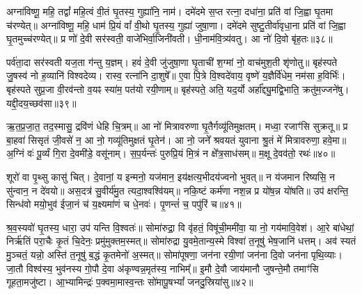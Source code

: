 अग्ना॑विष्णू॒ महि॒ तद्वां᳚ महि॒त्वं वी॒तं घृ॒तस्य॒ गुह्या॑नि॒ नाम॑। दमे॑दमे स॒प्त रत्ना॒ दधा॑ना॒ प्रति॑ वां जि॒ह्वा घृ॒तमा च॑रण्येत्॥ अग्ना॑विष्णू॒ महि॒ धाम॑ प्रि॒यं वां᳚ वी॒थो घृ॒तस्य॒ गुह्या॑ जुषा॒णा। दमे॑दमे सुष्टु॒तीर्वा॑वृधा॒ना प्रति॑ वां जि॒ह्वा घृ॒तमुच्च॑रण्येत्॥ प्र णो॑ दे॒वी सर॑स्वती॒ वाजे॑भिर्वा॒जिनी॑वती। धी॒नाम॑वि॒त्र्य॑वतु। आ नो॑ दि॒वो बृ॑ह॒तः॥३८॥

पर्व॑ता॒दा सर॑स्वती यज॒ता ग॑न्तु य॒ज्ञम्। हवं॑ दे॒वी जु॑जुषा॒णा घृ॒ताची॑ श॒ग्मां नो॒ वाच॑मुश॒ती शृ॑णोतु॥ बृह॑स्पते जु॒षस्व॑ नो ह॒व्यानि॑ विश्वदेव्य। रास्व॒ रत्ना॑नि दा॒शुषे᳚॥ ए॒वा पि॒त्रे वि॒श्वदे॑वाय॒ वृष्णे॑ य॒ज्ञैर्वि॑धेम॒ नम॑सा ह॒विर्भिः॑। बृह॑स्पते सुप्र॒जा वी॒रव॑न्तो व॒यꣴ स्या॑म॒ पत॑यो रयी॒णाम्॥ बृह॑स्पते॒ अति॒ यद॒र्यो अर्\mbox{}हा᳚द्द्यु॒मद्वि॒भाति॒ क्रतु॑म॒ज्जने॑षु। यद्दी॒दय॒च्छव॑सा॥३९॥

ऋ॒त॒प्र॒जा॒त॒ तद॒स्मासु॒ द्रवि॑णं धेहि चि॒त्रम्॥ आ नो॑ मित्रावरुणा घृ॒तैर्गव्यू॑तिमुक्षतम्। मध्वा॒ रजाꣳ॑सि सुक्रतू॥ प्र बा॒हवा॑ सिसृतं जी॒वसे॑ न॒ आ नो॒ गव्यू॑तिमुक्षतं घृ॒तेन॑। आ नो॒ जने᳚ श्रवयतं युवाना श्रु॒तं मे॑ मित्रावरुणा॒ हवे॒मा॥ अ॒ग्निं वः॑ पू॒र्व्यं गि॒रा दे॒वमी॑डे॒ वसू॑नाम्। स॒प॒र्यन्तः॑ पुरुप्रि॒यं मि॒त्रं न क्षे᳚त्र॒साध॑सम्॥ म॒क्षू दे॒वव॑तो॒ रथः॑॥४०॥

शूरो॑ वा पृ॒थ्सु कासु॑ चित्। दे॒वानां॒ य इन्मनो॒ यज॑मान॒ इय॑क्षत्य॒भीदय॑ज्वनो भुवत्॥ न य॑जमान रिष्यसि॒ न सु॑न्वान॒ न दे॑वयो॥ अस॒दत्र॑ सु॒वीर्य॑मु॒त त्यदा॒श्वश्वि॑यम्॥ नकि॒ष्टं कर्म॑णा नश॒न्न प्र यो॑ष॒न्न यो॑षति॥ उप॑ क्षरन्ति॒ सिन्ध॑वो मयो॒भुव॑ ईजा॒नं च॑ य॒क्ष्यमा॑णं च धे॒नवः॑। पृ॒णन्तं॑ च॒ पपु॑रिं च॥४१॥

श्र॒व॒स्यवो॑ घृ॒तस्य॒ धारा॒ उप॑ यन्ति वि॒श्वतः॑॥ सोमा॑रुद्रा॒ वि वृ॑हतं॒ विषू॑ची॒ममी॑वा॒ या नो॒ गय॑मावि॒वेश॑। आ॒रे बा॑धेथां॒ निर्\mbox{}ऋ॑तिं परा॒चैः कृ॒तं चि॒देनः॒ प्रमु॑मुक्तम॒स्मत्॥ सोमा॑रुद्रा यु॒वमे॒तान्य॒स्मे विश्वा॑ त॒नूषु॑ भेष॒जानि॑ धत्तम्। अव॑ स्यतं मु॒ञ्चतं॒ यन्नो॒ अस्ति॑ त॒नूषु॑ ब॒द्धं कृ॒तमेनो॑ अ॒स्मत्॥ सोमा॑पूषणा॒ जन॑ना रयी॒णां जन॑ना दि॒वो जन॑ना पृथि॒व्याः। जा॒तौ विश्व॑स्य॒ भुव॑नस्य गो॒पौ दे॒वा अ॑कृण्वन्न॒मृत॑स्य॒ नाभिम्᳚॥ इ॒मौ दे॒वौ जाय॑मानौ जुषन्ते॒मौ तमाꣳ॑सि गूहता॒मजु॑ष्टा। आ॒भ्यामिन्द्रः॑ प॒क्वमा॒मास्व॒न्तः सो॑मापू॒ष\-भ्यां᳚ जनदु॒स्रिया॑सु॥४२॥

{\anuvakamend[{बृ॒ह॒तः शव॑सा॒ रथः॒ पपु॑रिं च दि॒वो जन॑ना॒ पञ्च॑विꣳशतिश्च॥22॥}]}


{}

